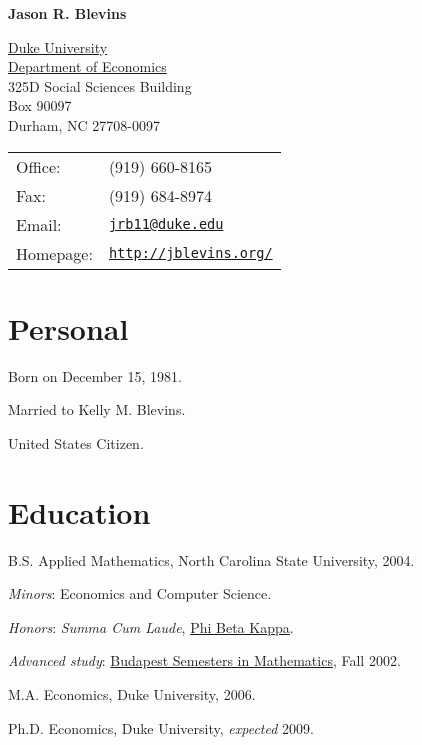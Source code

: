 \documentclass[letterpaper]{article}
\renewenvironment{itemize}{
  \begin{list}{}{
    \setlength{\leftmargin}{1em}
  }
}{
  \end{list}
}
\begin{document}
\begin{center} {\huge\bf Jason R. Blevins}

\vspace{0.25in}

\begin{minipage}{0.45\linewidth}
  \href{http://www.duke.edu/}{Duke University} \\
  \href{http://www.econ.duke.edu/}{Department of Economics} \\
  325D Social Sciences Building \\
  Box 90097 \\
  Durham, NC 27708-0097
\end{minipage}
\begin{minipage}{0.45\linewidth}
  \begin{tabular}{ll}
    Office: & (919) 660-8165 \\
    Fax: & (919) 684-8974 \\
    Email: & \href{mailto:jrb11@duke.edu}{\tt jrb11@duke.edu} \\
    Homepage: & \href{http://jblevins.org/}{\tt http://jblevins.org/} \\
  \end{tabular}
\end{minipage}
\end{center}

\section*{Personal}

\begin{itemize}
\item Born on December 15, 1981.
\item Married to Kelly M. Blevins.
\item United States Citizen.
\end{itemize}


\section*{Education}

\begin{itemize}
  \item B.S. Applied Mathematics, North Carolina State University, 2004.
    \begin{itemize}
    \item \textit{Minors}: Economics and Computer Science.
    \item \textit{Honors}: \textit{Summa Cum Laude},
      \href{http://www.pbk.org/}{Phi Beta Kappa}.
    \item \textit{Advanced study}:
      \href{http://www.stolaf.edu/depts/math-old/budapest/}{Budapest
        Semesters in Mathematics}, Fall 2002.
    \end{itemize}

  \item M.A. Economics, Duke University, 2006.

  \item Ph.D. Economics, Duke University, \textit{expected} 2009.
\end{itemize}
\end{document}
